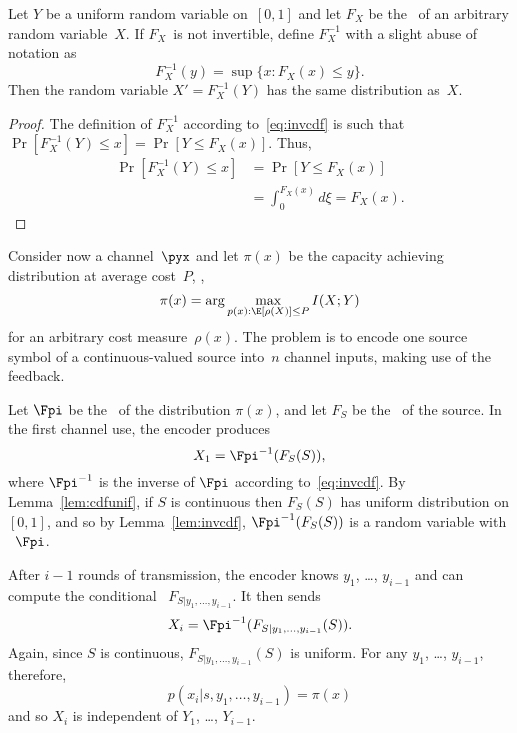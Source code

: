 \begin{lemma}
  \label{lem:invcdf}
  Let $Y$ be a uniform random variable on~$[0,1]$ and let $F_X$ be the \cdf\ of
  an arbitrary random variable~$X$. If $F_X$~is not invertible, define
  $F_X^{-1}$ with a slight abuse of notation as
  \begin{equation}
    \label{eq:invcdf}
    F_X^{-1}(y) = \sup \{x : F_X(x) \le y\}.
  \end{equation}
  Then the random variable $X' = F_X^{-1}(Y)$ has the same distribution as~$X$.
\end{lemma}

\begin{proof}
  The definition of $F_X^{-1}$ according to~\eqref{eq:invcdf} is such
  that $\Pr[F_X^{-1}(Y) \le x] = \Pr[Y \le F_X(x)]$. Thus,
  \begin{align*}
    \Pr[F_X^{-1}(Y) \le x] &= \Pr[Y \le F_X(x)] \\
    &= \int_0^{F_X(x)} d\xi = F_X(x).
  \end{align*}
\end{proof}

Consider now a channel~$\pyx$ and let $\pi(x)$ be the capacity achieving
distribution at average cost~$P$, \ie, 
\begin{equation*}
  \pi(x) = \arg\max_{p(x): \E[\rho(X)] \le P} I(X;Y)
\end{equation*}
for an arbitrary cost measure~$\rho(x)$.  The problem is to encode one source
symbol of a continuous-valued source into~$n$ channel inputs, making use of the
feedback.

Let $\Fpi$ be the \cdf\ of the distribution $\pi(x)$, and let $F_S$ be the \cdf\
of the source. In the first channel use, the encoder produces
\begin{equation}
  \label{eq:posteriorx1}
  X_1 = \Fpi^{-1}(F_S(S)),
\end{equation}
where $\Fpi^{-1}$ is the inverse of $\Fpi$ according to~\eqref{eq:invcdf}. By
Lemma~\ref{lem:cdfunif}, if $S$ is continuous then $F_S(S)$ has uniform
distribution on $[0,1]$, and so by Lemma~\ref{lem:invcdf}, $\Fpi^{-1}(F_S(S))$
is a random variable with \cdf\ $\Fpi$.

After $i-1$ rounds of transmission, the encoder knows $y_1$, \ldots, $y_{i-1}$
and can compute the conditional \cdf\ $F_{S|y_1, \ldots, y_{i-1}}$. It then
sends
\begin{equation}
  \label{eq:posteriorxi}
  X_i = \Fpi^{-1}(F_{S|y_1,\dots,y_{i-1}}(S)).
\end{equation}
Again, since $S$ is continuous, $F_{S|y_1, \dots, y_{i-1}}(S)$ is uniform. For
any $y_1$, \ldots, $y_{i-1}$, therefore, \begin{equation*}
  p(x_i|s, y_1, \dots, y_{i-1}) = \pi(x)
\end{equation*}
and so $X_i$ is independent of $Y_1$, \ldots, $Y_{i-1}$. 

